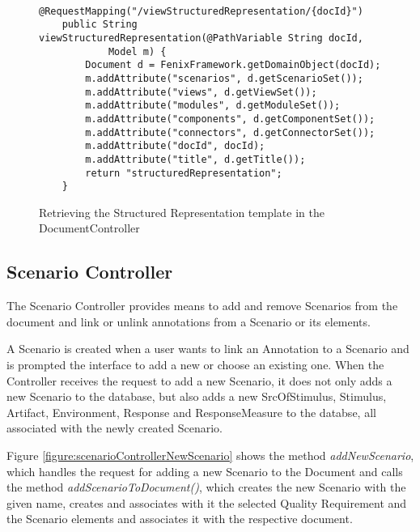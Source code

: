 \begin{itemize}
\begin{figure}[h]
\lstset{style=customjava}
\begin{lstlisting}
	@RequestMapping("/viewStructuredRepresentation/{docId}")
	public String viewStructuredRepresentation(@PathVariable String docId,
			Model m) {
		Document d = FenixFramework.getDomainObject(docId);
		m.addAttribute("scenarios", d.getScenarioSet());
		m.addAttribute("views", d.getViewSet());
		m.addAttribute("modules", d.getModuleSet());
		m.addAttribute("components", d.getComponentSet());
		m.addAttribute("connectors", d.getConnectorSet());
		m.addAttribute("docId", docId);
		m.addAttribute("title", d.getTitle());
		return "structuredRepresentation";
	}
\end{lstlisting}
\caption{Retrieving the Structured Representation template in the DocumentController}
\label{figure:documentControllerStructuredRepresentation}
\end{figure}
\end{itemize}

\subsection{Scenario Controller}

The Scenario Controller provides means to add and remove Scenarios from the document and link or unlink annotations from a Scenario or its elements.

A Scenario is created when a user wants to link an Annotation to a Scenario and is prompted the interface to add a new or choose an existing one. When the Controller receives the request to add a new Scenario, it does not only adds a new Scenario to the database, but also adds a new SrcOfStimulus, Stimulus, Artifact, Environment, Response and ResponseMeasure to the databse, all associated with the newly created Scenario. 

Figure \ref{figure:scenarioControllerNewScenario} shows the method \textit{addNewScenario}, which handles the request for adding a new Scenario to the Document and calls the method \textit{addScenarioToDocument()}, which creates the new Scenario with the given name, creates and associates with it the selected Quality Requirement and the Scenario elements and associates it with the respective document.

